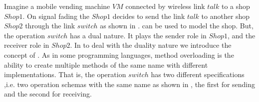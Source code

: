 Imagine a mobile vending machine $VM$ connected by wireless link $talk$ to a shop $Shop1$. On signal fading the $Shop1$ decides to send the link $talk$ to another shop $Shop2$ through the link $switch$ as shown in . \oz{} can be used to model the shop. But, the operation $switch$ has a dual nature. It plays the sender role in $Shop1$, and the receiver role in $Shop2$.
 In \oz{} to deal with the duality nature we introduce the concept of . As in some programming languages, method overloading is the ability to create multiple methods of the same name with different implementations. That is, the operation $switch$ has two different specifications ,i.e. two operation schemas with the same name as shown in , the first for sending and the second for receiving.




